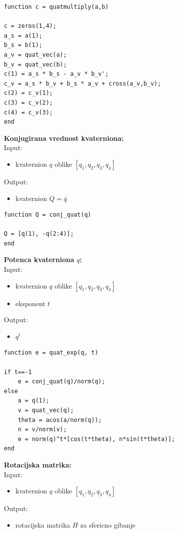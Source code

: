 \documentclass[12pt,a4paper,twoside]{article}
\theoremstyle{definition} %
\theoremstyle{plain} %
\numberwithin{equation}{section}  %
\begin{document}
\begin{lstlisting}[caption = {quatmultiply}]
function c = quatmultiply(a,b)

c = zeros(1,4);
a_s = a(1);
b_s = b(1);
a_v = quat_vec(a);
b_v = quat_vec(b);
c(1) = a_s * b_s - a_v * b_v';
c_v = a_s * b_v + b_s * a_v + cross(a_v,b_v);
c(2) = c_v(1);
c(3) = c_v(2);
c(4) = c_v(3);
end
\end{lstlisting}

\textbf{Konjugirana vrednost kvaterniona:}\\
Input:
\begin{itemize}
\item kvaternion $q$ oblike $[q_1,q_2,q_3,q_4]$
\end{itemize}
Output:
\begin{itemize}
\item kvaternion $Q = \overline{q}$
\end{itemize}

\begin{lstlisting}[caption = {conj\_quat}]
function Q = conj_quat(q)

Q = [q(1), -q(2:4)];
end
\end{lstlisting}


\vspace{0.5cm}
\textbf{Potenca kvaterniona $q$:}\\
Input:
\begin{itemize}
\item kvaternion $q$ oblike $[q_1,q_2,q_3,q_4]$
\item eksponent $t$
\end{itemize}
Output:
\begin{itemize}
\item $q^t$
\end{itemize}
\begin{lstlisting}[caption = {quat\_exp}]
function e = quat_exp(q, t)

if t==-1
    e = conj_quat(q)/norm(q);
else
    a = q(1);
    v = quat_vec(q);
    theta = acos(a/norm(q));
    n = v/norm(v);
    e = norm(q)^t*[cos(t*theta), n*sin(t*theta)];
end
\end{lstlisting}

\vspace{1cm}

\textbf{Rotacijska matrika:}\\
Input:
\begin{itemize}
\item kvaternion $q$ oblike $[q_1,q_2,q_3,q_4]$
\end{itemize}
Output: 
\begin{itemize}
\item rotacijska matrika $H$ za sfericno gibanje
\end{itemize}
\end{document}
